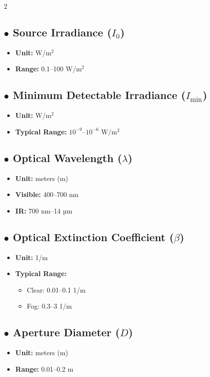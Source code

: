 \documentclass{article}
\begin{document}
\begin{multicols}{2}
	\subsection*{$\bullet$ Source Irradiance ($I_0$)}
	\begin{itemize}
		\item \textbf{Unit:} W/m$^2$
		\item \textbf{Range:} 0.1--100 W/m$^2$
	\end{itemize}
	
	\subsection*{$\bullet$ Minimum Detectable Irradiance ($I_{\min}$)}
	\begin{itemize}
		\item \textbf{Unit:} W/m$^2$
		\item \textbf{Typical Range:} $10^{-9}$--$10^{-6}$ W/m$^2$
	\end{itemize}
	
	\subsection*{$\bullet$ Optical Wavelength ($\lambda$)}
	\begin{itemize}
		\item \textbf{Unit:} meters (m)
		\item \textbf{Visible:} 400--700 nm
		\item \textbf{IR:} 700 nm--14 µm
	\end{itemize}
	
	\subsection*{$\bullet$ Optical Extinction Coefficient ($\beta$)}
	\begin{itemize}
		\item \textbf{Unit:} 1/m
		\item \textbf{Typical Range:}
		\begin{itemize}
			\item Clear: 0.01--0.1 1/m
			\item Fog: 0.3--3 1/m
		\end{itemize}
	\end{itemize}
	
	\subsection*{$\bullet$ Aperture Diameter ($D$)}
	\begin{itemize}
		\item \textbf{Unit:} meters (m)
		\item \textbf{Range:} 0.01--0.2 m
	\end{itemize}
	

\end{multicols}
\end{document}
